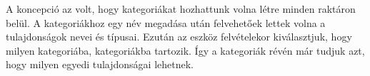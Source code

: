 A koncepció az volt, hogy kategoriákat hozhattunk volna létre minden raktáron belül.
A kategoriákhoz egy név megadása után felvehetőek lettek volna a tulajdonságok nevei és típusai.
Ezután az eszköz felvételekor kiválasztjuk, hogy milyen kategoriába, kategoriákba tartozik. 
Így a kategoriák révén már tudjuk azt, hogy milyen egyedi tulajdonságai lehetnek.

